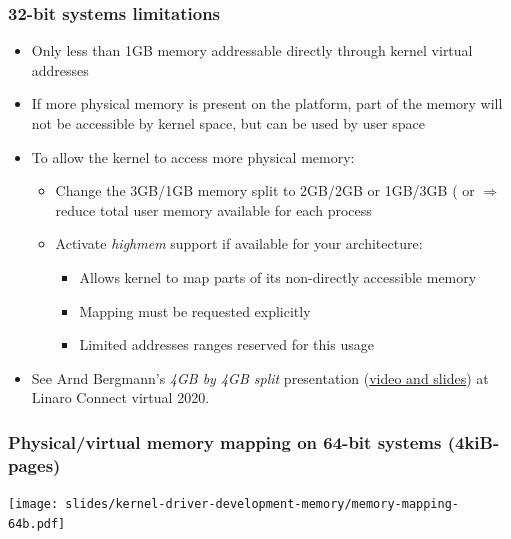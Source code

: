 \begin{frame}
  \frametitle{32-bit systems limitations}
  \begin{itemize}
  \item Only less than 1GB memory addressable directly through kernel
    virtual addresses
  \item If more physical memory is present on the platform, part of
    the memory will not be accessible by kernel space, but can be used
    by user space
  \item To allow the kernel to access more physical memory:
    \begin{itemize}
    \item Change the 3GB/1GB memory split to 2GB/2GB or 1GB/3GB
      ( or 
      $\Rightarrow$ reduce total user memory available for each process
    \item Activate \emph{highmem} support if available for your
      architecture:
      \begin{itemize}
      \item Allows kernel to map parts of its non-directly accessible
            memory
      \item Mapping must be requested explicitly
      \item Limited addresses ranges reserved for this usage
      \end{itemize}
    \end{itemize}
  \item See Arnd Bergmann's {\em 4GB by 4GB split} presentation
        (\href{https://resources.linaro.org/en/resource/TXkzgNDFp3HiJKdfQjbssL}
        {video and slides}) at Linaro Connect virtual 2020.
  \end{itemize}
\end{frame}

\begin{frame}
  \frametitle{Physical/virtual memory mapping on 64-bit systems (4kiB-pages)}
  \begin{center}
    \texttt{[image: slides/kernel-driver-development-memory/memory-mapping-64b.pdf]}
  \end{center}
\end{frame}

